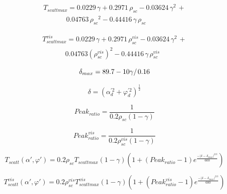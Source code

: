 \begin{equation}
\begin{array}{l}{T_{scattmax}} = 0.0229\,\gamma  + 0.2971\,{\rho_{sc}} - 0.03624\,{\gamma ^2}\, + \\\,\,\,\,\,\,\,\,\,\,\,\,\,\,\,\,\,\,\,\,0.04763\,{\rho_{sc}}^2 - 0.44416\,\gamma \,{\rho_{sc}}\end{array}
\end{equation}

\begin{equation}
\begin{array}{l}T_{scattmax}^{vis} = 0.0229\,\gamma  + 0.2971\,\rho_{sc}^{vis} - 0.03624\,{\gamma ^2}\, + \\\,\,\,\,\,\,\,\,\,\,\,\,\,\,\,\,\,\,\,\,0.04763{\left( {\rho_{sc}^{vis}} \right)^2} - 0.44416\,\gamma \,\rho_{sc}^{vis}\end{array}
\end{equation}

\begin{equation}
{\delta_{max}} = 89.7 - {{10\gamma } \mathord{\left/ {\vphantom {{10\gamma } {0.16}}} \right. } {0.16}}
\end{equation}

\begin{equation}
\delta  = {\left( {\alpha_d^{'2} + \varphi_d^{'2}} \right)^{\frac{1}{2}}}
\end{equation}

\begin{equation}
  Peak_{ratio} = \frac{1}{0.2{\rho_{sc}}\left( {1 - \gamma } \right)}
\end{equation}

\begin{equation}
  Peak_{ratio}^{vis} = \frac{1}{0.2\rho_{sc}^{vis}\left( {1 - \gamma } \right)}
\end{equation}

\begin{equation}
{T_{scatt}}\left( {\alpha ',\varphi '} \right) = 0.2{\rho_{sc}}{T_{scattmax}}\left( {1 - \gamma } \right)\left( {1 + \left( {Pea{k_{ratio}} - 1} \right){e^{\frac{{ - {{\left| {\delta  - {\delta_{max}}} \right|}^{2.0}}}}{{600}}}}} \right)
\end{equation}

\begin{equation}
T_{scatt}^{vis}\left( {\alpha ',\varphi '} \right) = 0.2\rho_{sc}^{vis}T_{scattmax}^{vis}\left( {1 - \gamma } \right)\left( {1 + \left( {Peak_{ratio}^{vis} - 1} \right){e^{\frac{{ - {{\left| {\delta  - {\delta_{max}}} \right|}^{2.0}}}}{{600}}}}} \right)
\end{equation}

